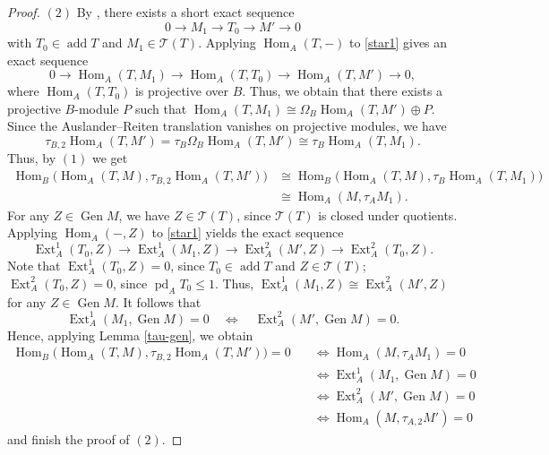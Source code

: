 \documentclass[reqno,12pt]{amsart}
\numberwithin{equation}{section}
\theoremstyle{plain}
\theoremstyle{definition}
\begin{document}
\begin{proof}
$(2)$ By \cite[Theorem 2.5(c) and Corollary 2.6]{ASS}, there exists a
short exact sequence
\begin{equation}\label{star1}
0\longrightarrow M_1\longrightarrow T_0\longrightarrow M'
\longrightarrow0
\end{equation}
with $T_0\in\operatorname{add}T$ and
$M_1\in\mathcal{T}(T)$. Applying $\operatorname{Hom}_A(T,-)$ to
\eqref{star1} gives an exact sequence
\[
0\longrightarrow\operatorname{Hom}_A(T,M_1)
\longrightarrow\operatorname{Hom}_A(T,T_0)
\longrightarrow\operatorname{Hom}_A(T,M')
\longrightarrow0,
\]
where $\operatorname{Hom}_A(T,T_0)$ is projective over $B$. Thus, we obtain that there exists a projective
$B$-module $P$ such that
$\operatorname{Hom}_A(T,M_1)
\cong
\Omega_B\operatorname{Hom}_A(T,M')\oplus P.$
Since the Auslander--Reiten translation vanishes on projective modules, we have
\[
\tau_{B,2}\operatorname{Hom}_A(T,M')
=
\tau_B\Omega_B\operatorname{Hom}_A(T,M')
\cong
\tau_B\operatorname{Hom}_A(T,M_1).
\]
Thus, by $(1)$ we get
\begin{align*}
\operatorname{Hom}_B
 \bigl(\operatorname{Hom}_A(T,M),
       \tau_{B,2}\operatorname{Hom}_A(T,M')\bigr)
&\cong
\operatorname{Hom}_B
 \bigl(\operatorname{Hom}_A(T,M),
       \tau_B\operatorname{Hom}_A(T,M_1)\bigr)\\
&\cong
\operatorname{Hom}_A(M,\tau_A M_1).
\end{align*}
For any $Z\in\operatorname{Gen}M$, we have
$Z\in\mathcal{T}(T)$, since
$\mathcal{T}(T)$ is closed under quotients. Applying $\operatorname{Hom}_A(-,Z)$ to
\eqref{star1} yields the exact sequence
\[
\operatorname{Ext}_A^1(T_0,Z)
\longrightarrow
\operatorname{Ext}_A^1(M_1,Z)
\longrightarrow
\operatorname{Ext}_A^2(M',Z)
\longrightarrow
\operatorname{Ext}_A^2(T_0,Z).
\]
Note that $\operatorname{Ext}_A^1(T_0,Z)=0$, since
$T_0\in\operatorname{add}T$ and $Z\in\mathcal{T}(T)$;
$\operatorname{Ext}_A^2(T_0,Z)=0$, since
$\operatorname{pd}_A T_0\leq1$. Thus,
$\operatorname{Ext}_A^1(M_1,Z)
\cong
\operatorname{Ext}_A^2(M',Z)$ for any $Z\in\operatorname{Gen}M.$
It follows that
\[
\operatorname{Ext}_A^1(M_1,\operatorname{Gen}M)=0
\quad\Longleftrightarrow\quad
\operatorname{Ext}_A^2(M',\operatorname{Gen}M)=0.
\]
Hence, applying Lemma \ref{tau-gen}, we obtain
\begin{align*}
\operatorname{Hom}_B
 \bigl(\operatorname{Hom}_A(T,M),
       \tau_{B,2}\operatorname{Hom}_A(T,M')\bigr)=0
&\quad\Longleftrightarrow
\operatorname{Hom}_A(M,\tau_A M_1)=0\\
&\quad\Longleftrightarrow
\operatorname{Ext}_A^1(M_1,\operatorname{Gen}M)=0\\
&\quad\Longleftrightarrow
\operatorname{Ext}_A^2(M',\operatorname{Gen}M)=0\\
&\quad\Longleftrightarrow
\operatorname{Hom}_A(M,\tau_{A,2}M')=0
\end{align*}
and finish the proof of $(2)$.


\end{proof}
\end{document}
